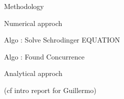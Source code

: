 Methodology


Numerical approch

Algo : Solve Schrodinger EQUATION

Algo : Found Concurrence

Analytical approch 

(cf intro report for Guillermo)
